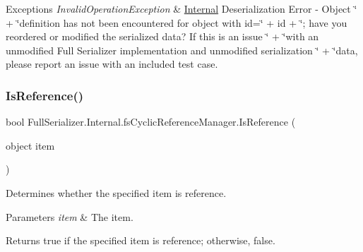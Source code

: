 \begin{DoxyExceptions}{Exceptions}
{\em Invalid\+Operation\+Exception} & \hyperlink{namespace_full_serializer_1_1_internal}{Internal} Deserialization Error -\/ Object \char`\"{} +
                    \char`\"{}definition has not been encountered for object with id=\char`\"{} + id +
                    \char`\"{}; have you reordered or modified the serialized data? If this is an issue \char`\"{} +
                    \char`\"{}with an unmodified Full Serializer implementation and unmodified serialization \char`\"{} +
                    \char`\"{}data, please report an issue with an included test case.\\
\hline
\end{DoxyExceptions}
\mbox{\label{class_full_serializer_1_1_internal_1_1fs_cyclic_reference_manager_a6b65d1c5f70cf7b2c3ed5602e1173c88}} 
\subsubsection{\texorpdfstring{Is\+Reference()}{IsReference()}}
{\footnotesize\ttfamily bool Full\+Serializer.\+Internal.\+fs\+Cyclic\+Reference\+Manager.\+Is\+Reference (\begin{DoxyParamCaption}\item[{object}]{item }\end{DoxyParamCaption})\hspace{0.3cm}{\ttfamily [inline]}}



Determines whether the specified item is reference. 


\begin{DoxyParams}{Parameters}
{\em item} & The item.\\
\hline
\end{DoxyParams}
\begin{DoxyReturn}{Returns}
{\ttfamily true} if the specified item is reference; otherwise, {\ttfamily false}.
\end{DoxyReturn}
\mbox{\label{class_full_serializer_1_1_internal_1_1fs_cyclic_reference_manager_a3dc671b9811d57d107fbd567b6d2a957}} 
